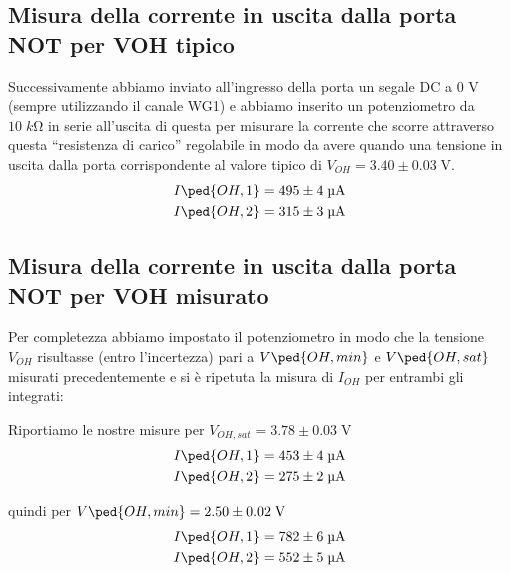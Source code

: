 \documentclass[10pt, a4paper, italian]{article}
\begin{document}
\subsection{Misura della corrente in uscita dalla porta NOT per VOH tipico}
Successivamente abbiamo inviato all'ingresso della porta un segale DC a 0 V
(sempre utilizzando il canale WG1) e abbiamo inserito un potenziometro da
$10 \; \si{k\ohm}$ in serie all'uscita di questa per misurare la corrente che
scorre attraverso questa ``resistenza di carico'' regolabile in modo da
avere quando una tensione in uscita dalla porta corrispondente al valore
tipico di $V_{OH}= 3.40 \pm 0.03 \; \si{\V}$.
\begin{align*}
    I\ped{OH, 1} &= 495 \pm 4 \; \si{\micro\A} \\
    I\ped{OH, 2} &= 315 \pm 3 \; \si{\micro\A} \\   
\end{align*}

\subsection{Misura della corrente in uscita dalla porta NOT per VOH misurato}
Per completezza abbiamo impostato il potenziometro in modo che la tensione
$V_{OH}$ risultasse (entro l'incertezza) pari a $V\ped{OH, min}$ e
$V\ped{OH, sat}$ misurati precedentemente e si è ripetuta la misura di
$I_{OH}$ per entrambi gli integrati:

Riportiamo le nostre misure per $V_{OH,sat}= 3.78 \pm 0.03 \; \si{\V}$
\begin{align*}
    I\ped{OH, 1} &= 453 \pm 4 \; \si{\micro\A} \\
    I\ped{OH, 2} &= 275 \pm 2 \; \si{\micro\A} \\   
\end{align*}

quindi per $V\ped{OH, min}= 2.50 \pm 0.02 \; \si{\V}$
\begin{align*}
    I\ped{OH, 1} &= 782 \pm 6 \; \si{\micro\A} \\
    I\ped{OH, 2} &= 552 \pm 5 \; \si{\micro\A} \\   
\end{align*}
\end{document}
